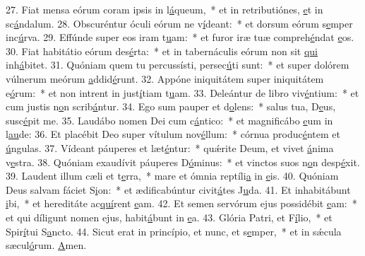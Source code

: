 27. Fiat mensa eórum coram ipsis in l\uline{á}queum,~* et in retributiónes, \uline{e}t in sc\uline{á}ndalum.
28. Obscuréntur óculi eórum ne v\uline{í}deant:~* et dorsum eórum s\uline{e}mper inc\uline{ú}rva.
29. Effúnde super eos iram t\uline{u}am:~* et furor iræ tuæ compreh\uline{é}ndat \uline{e}os.
30. Fiat habitátio eórum des\uline{é}rta:~* et in tabernáculis eórum non sit \uline{qui} inh\uline{á}bitet.
31. Quóniam quem tu percussísti, persec\uline{ú}ti sunt:~* et super dolórem vúlnerum meórum \uline{a}ddid\uline{é}runt.
32. Appóne iniquitátem super iniquitátem e\uline{ó}rum:~* et non intrent in just\uline{í}tiam t\uline{u}am.
33. Deleántur de libro viv\uline{é}ntium:~* et cum justis n\uline{o}n scrib\uline{á}ntur.
34. Ego sum pauper et d\uline{o}lens:~* salus tua, D\uline{e}us, susc\uline{é}pit me.
35. Laudábo nomen Dei cum c\uline{á}ntico:~* et magnificábo \uline{e}um in l\uline{au}de:
36. Et placébit Deo super vítulum nov\uline{é}llum:~* córnua produc\uline{é}ntem et \uline{ú}ngulas.
37. Vídeant páuperes et læt\uline{é}ntur:~* quǽrite Deum, et vivet \uline{á}nima v\uline{e}stra.
38. Quóniam exaudívit páuperes D\uline{ó}minus:~* et vinctos suos n\uline{o}n desp\uline{é}xit.
39. Laudent illum cæli et t\uline{e}rra,~* mare et ómnia reptíli\uline{a} in \uline{e}is.
40. Quóniam Deus salvam fáciet S\uline{i}on:~* et ædificabúntur civit\uline{á}tes J\uline{u}da.
41. Et inhabitábunt \uline{i}bi,~* et hereditáte ac\uline{quí}rent \uline{e}am.
42. Et semen servórum ejus possidébit \uline{e}am:~* et qui díligunt nomen ejus, habit\uline{á}bunt in \uline{e}a.
43. Glória Patri, et F\uline{í}lio,~* et Spir\uline{í}tui S\uline{a}ncto.
44. Sicut erat in princípio, et nunc, et s\uline{e}mper,~* et in sǽcula sæcul\uline{ó}rum. \uline{A}men.
